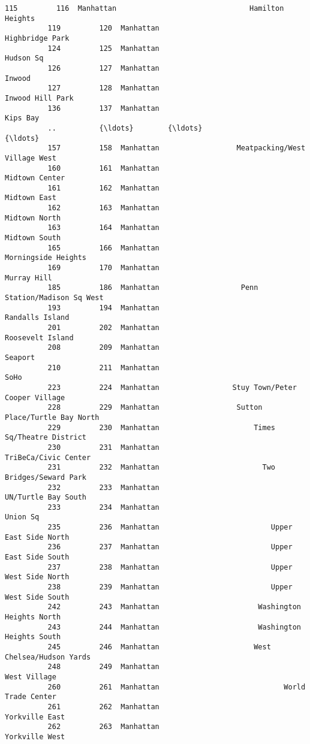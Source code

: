 \documentclass[11pt]{article}
\begin{document}
\begin{Verbatim}[commandchars=\\\{\}]
          115         116  Manhattan                               Hamilton Heights   
          119         120  Manhattan                                Highbridge Park   
          124         125  Manhattan                                      Hudson Sq   
          126         127  Manhattan                                         Inwood   
          127         128  Manhattan                               Inwood Hill Park   
          136         137  Manhattan                                       Kips Bay   
          ..          {\ldots}        {\ldots}                                            {\ldots}   
          157         158  Manhattan                  Meatpacking/West Village West   
          160         161  Manhattan                                 Midtown Center   
          161         162  Manhattan                                   Midtown East   
          162         163  Manhattan                                  Midtown North   
          163         164  Manhattan                                  Midtown South   
          165         166  Manhattan                            Morningside Heights   
          169         170  Manhattan                                    Murray Hill   
          185         186  Manhattan                   Penn Station/Madison Sq West   
          193         194  Manhattan                                Randalls Island   
          201         202  Manhattan                               Roosevelt Island   
          208         209  Manhattan                                        Seaport   
          210         211  Manhattan                                           SoHo   
          223         224  Manhattan                 Stuy Town/Peter Cooper Village   
          228         229  Manhattan                  Sutton Place/Turtle Bay North   
          229         230  Manhattan                      Times Sq/Theatre District   
          230         231  Manhattan                           TriBeCa/Civic Center   
          231         232  Manhattan                        Two Bridges/Seward Park   
          232         233  Manhattan                            UN/Turtle Bay South   
          233         234  Manhattan                                       Union Sq   
          235         236  Manhattan                          Upper East Side North   
          236         237  Manhattan                          Upper East Side South   
          237         238  Manhattan                          Upper West Side North   
          238         239  Manhattan                          Upper West Side South   
          242         243  Manhattan                       Washington Heights North   
          243         244  Manhattan                       Washington Heights South   
          245         246  Manhattan                      West Chelsea/Hudson Yards   
          248         249  Manhattan                                   West Village   
          260         261  Manhattan                             World Trade Center   
          261         262  Manhattan                                 Yorkville East   
          262         263  Manhattan                                 Yorkville West   
          

\end{Verbatim}
\end{document}
